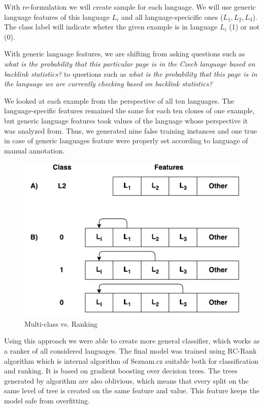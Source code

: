 \documentclass{acm_proc_article-sp}
\begin{document}
  With re-formulation we will create sample for each language.
  We will use generic language features of this language $L_i$ and all language-specicific
  ones ($L_1, L_2, L_3$). The class label will indicate wheter the given example is in language $L_i$ (1) or not (0).


  With generic language features, we are shifting from asking questions such as \textit{what is the probability that 
    this particular page is in the Czech language based on backlink statistics?} to questions 
    such as \textit{what is the probability that this page is in the language we are currently checking 
    based on backlink statistics?} 
 
 We looked at each example from the perspective of all ten languages. The 
  language-specific features remained the same for each ten clones of one example,
  but generic language features took values of the language whose perspective
  it was analyzed from.  Thus, we generated nine false training instances and 
  one true in case of generic languages feature were properly set according to 
  language of manual annotation.

  \begin{figure}
      \caption{Multi-class vs. Ranking} 
     \label{examples} 
 
 \vspace{0.5cm}
      \centering
      \includegraphics[scale=0.5]{multiclass.pdf}
 \end{figure}

  Using this approach we were able to create more general classifier, which works as a ranker of all considered languages.
  The final model was trained using RC-Rank algorithm which is internal algorithm of Seznam.cz suitable both for classification and ranking.
  It is based on gradient boosting over decision trees. The trees generated by algorithm are also oblivious, 
  which means that every split on the same level of tree is created on the same feature and value.
  This feature keeps the model safe from overfitting.
\end{document}
